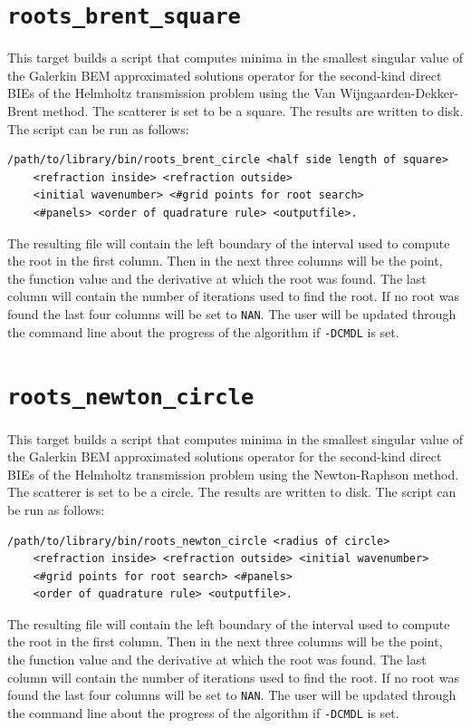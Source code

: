\documentclass[a4paper, oneside]{discothesis}
\begin{document}
\cprotect\section{\verb|roots_brent_square|}
This target builds a script that computes minima in the smallest singular value of the
Galerkin BEM approximated solutions operator for the second-kind direct BIEs of the Helmholtz
transmission problem using the Van Wijngaarden-Dekker-Brent method.
The scatterer is set to be a square.
The results are written to disk.
The script can be run as follows:
\begin{verbatim}
/path/to/library/bin/roots_brent_circle <half side length of square> 
	<refraction inside> <refraction outside> 
	<initial wavenumber> <#grid points for root search> 
	<#panels> <order of quadrature rule> <outputfile>.
\end{verbatim}
The resulting file will contain the left boundary of the interval used to compute the root in the first column. 
Then in the next three columns will be the point, the function value and the derivative at which the root was found.
The last column will contain the number of iterations used to find the root.
If no root was found the last four columns will be set to \verb|NAN|.
The user will be updated through the command line about the progress of the algorithm if \verb|-DCMDL| is set.

\cprotect\section{\verb|roots_newton_circle|}
This target builds a script that computes minima in the smallest singular value of the
Galerkin BEM approximated solutions operator for the second-kind direct BIEs of the Helmholtz
transmission problem using the Newton-Raphson method.
The scatterer is set to be a circle.
The results are written to disk.
The script can be run as follows:
\begin{verbatim}
/path/to/library/bin/roots_newton_circle <radius of circle> 
	<refraction inside> <refraction outside> <initial wavenumber> 
	<#grid points for root search> <#panels> 
	<order of quadrature rule> <outputfile>.
\end{verbatim}
The resulting file will contain the left boundary of the interval used to compute the root in the first column. 
Then in the next three columns will be the point, the function value and the derivative at which the root was found.
The last column will contain the number of iterations used to find the root.
If no root was found the last four columns will be set to \verb|NAN|.
The user will be updated through the command line about the progress of the algorithm if \verb|-DCMDL| is set.
\end{document}
